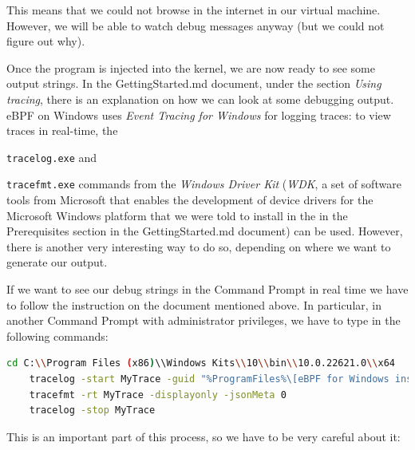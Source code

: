This means that we could not browse in the internet in our virtual machine.
However, we will be able to watch debug messages anyway (but we could not figure out why).

Once the program is injected into the kernel, we are now ready to see some output strings.
In the GettingStarted.md document, under the section \textit{Using tracing}, there is an explanation on how we can look at some debugging output.
eBPF on Windows uses \textit{Event Tracing for Windows} for logging traces: to view traces in real-time, the  \raggedright\colorbox{backcolour}{\lstinline[style=commandline, language=bash]|tracelog.exe|} and \raggedright\colorbox{backcolour}{\lstinline[style=commandline, language=bash]|tracefmt.exe|} commands from the \textit{Windows Driver Kit} (\textit{WDK}, a set of software tools from Microsoft that enables the development of device drivers for the Microsoft Windows platform that we were told to install in the in the Prerequisites section in the GettingStarted.md document) can be used.  
However, there is another very interesting way to do so, depending on where we want to generate our output.

If we want to see our debug strings in the Command Prompt in real time we have to follow the instruction on the document mentioned above.
In particular, in another Command Prompt with administrator privileges, we have to type in the following commands:

\begin{lstlisting}[style=commandline, language=bash, caption={Commands to start real-time debugging using \colorbox{backcolour}{\lstinline[style=commandline, language=bash]|tracelog|} and \colorbox{backcolour}{\lstinline[style=commandline, language=bash]|tracefmt|}.}]
	cd C:\\Program Files (x86)\\Windows Kits\\10\\bin\\10.0.22621.0\\x64
	tracelog -start MyTrace -guid "%ProgramFiles%\[eBPF for Windows install folder]\ebpf-printk.guid" -rt 
	tracefmt -rt MyTrace -displayonly -jsonMeta 0
	tracelog -stop MyTrace
\end{lstlisting}

This is an important part of this process, so we have to be very careful about it:

